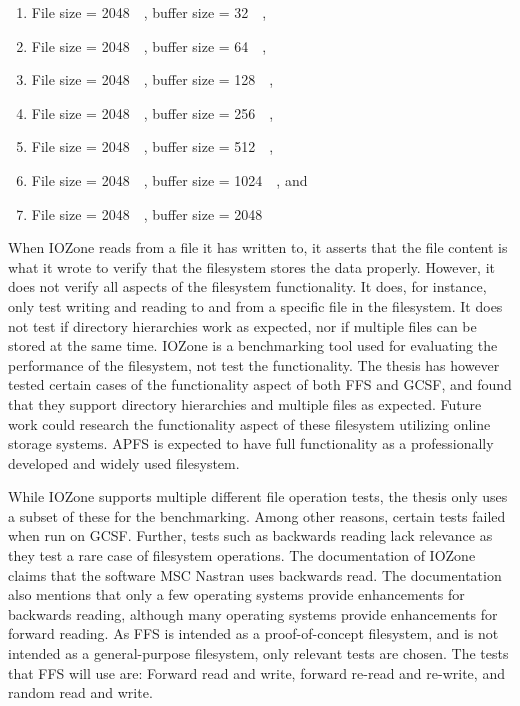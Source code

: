 \begin{enumerate}
\begin{enumerate}
	\item File size = \SI{2048}{\kilo\byte}, buffer size = \SI{32}{\kilo\byte},
	\item File size = \SI{2048}{\kilo\byte}, buffer size = \SI{64}{\kilo\byte},
	\item File size = \SI{2048}{\kilo\byte}, buffer size = \SI{128}{\kilo\byte},
	\item File size = \SI{2048}{\kilo\byte}, buffer size = \SI{256}{\kilo\byte},
	\item File size = \SI{2048}{\kilo\byte}, buffer size = \SI{512}{\kilo\byte},
	\item File size = \SI{2048}{\kilo\byte}, buffer size = \SI{1024}{\kilo\byte}, and
	\item File size = \SI{2048}{\kilo\byte}, buffer size = \SI{2048}{\kilo\byte}
\end{enumerate}

When IOZone reads from a file it has written to, it asserts that the file content is what it wrote to verify that the filesystem stores the data properly. However, it does not verify all aspects of the filesystem functionality. It does, for instance, only test writing and reading to and from a specific file in the filesystem. It does not test if directory hierarchies work as expected, nor if multiple files can be stored at the same time. IOZone is a benchmarking tool used for evaluating the performance of the filesystem, not test the functionality. The thesis has however tested certain cases of the functionality aspect of both FFS and GCSF, and found that they support directory hierarchies and multiple files as expected. Future work could research the functionality aspect of these filesystem utilizing online storage systems. APFS is expected to have full functionality as a professionally developed and widely used filesystem.

While IOZone supports multiple different file operation tests, the thesis only uses a subset of these for the benchmarking. Among other reasons, certain tests failed when run on GCSF. Further, tests such as backwards reading lack relevance as they test a rare case of filesystem operations. The documentation of IOZone\,\cite{iozoneIozoneFilesystemBenchmark} claims that the software MSC Nastran uses backwards read. The documentation also mentions that only a few operating systems provide enhancements for backwards reading, although many operating systems provide enhancements for forward reading. As FFS is intended as a proof-of-concept filesystem, and is not intended as a general-purpose filesystem, only relevant tests are chosen. The tests that FFS will use are: Forward read and write, forward re-read and re-write, and random read and write.


\end{enumerate}
